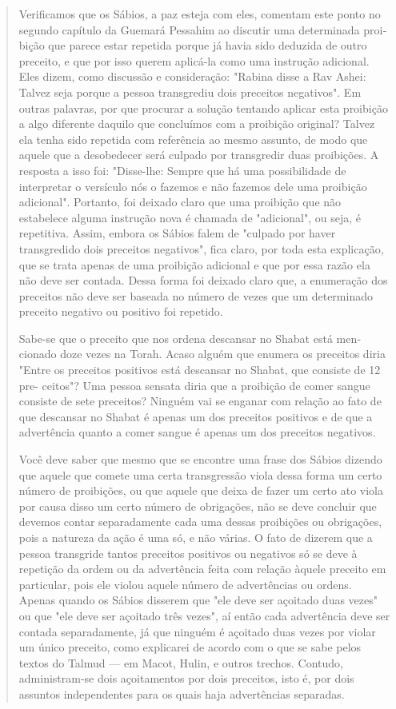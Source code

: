 \begin{quote}
Verificamos que os Sábios, a paz esteja com eles, comentam este pon­to
no segundo capítulo da Guemará Pessahim ao discutir uma determinada
proi­bição que parece estar repetida porque já havia sido deduzida de
outro precei­to, e que por isso querem aplicá-la como uma instrução
adicional. Eles dizem, como discussão e consideração: "Rabina disse a
Rav Ashei: Talvez seja porque a pessoa transgrediu dois preceitos
negativos". Em outras palavras, por que pro­curar a solução tentando
aplicar esta proibição a algo diferente daquilo que con­cluímos com a
proibição original? Talvez ela tenha sido repetida com referên­cia ao
mesmo assunto, de modo que aquele que a desobedecer será culpado por
transgredir duas proibições. A resposta a isso foi: "Disse-lhe: Sempre
que há uma possibilidade de interpretar o versículo nós o fazemos e não
fazemos dele uma proibição adicional". Portanto, foi deixado claro que
uma proibição que não estabelece alguma instrução nova é chamada de
"adicional", ou seja, é repetitiva. Assim, embora os Sábios falem de
"culpado por haver transgredi­do dois preceitos negativos", fica claro,
por toda esta explicação, que se trata apenas de uma proibição adicional
e que por essa razão ela não deve ser conta­da. Dessa forma foi deixado
claro que, a enumeração dos preceitos não deve ser baseada no número de
vezes que um determinado preceito negativo ou po­sitivo foi repetido.

Sabe-se que o preceito que nos ordena descansar no Shabat está
men­cionado doze vezes na Torah. Acaso alguém que enumera os preceitos
diria "Entre os preceitos positivos está descansar no Shabat, que
consiste de 12 pre-
ceitos"? Uma pessoa sensata diria que a proibição de comer sangue
consiste de sete preceitos? Ninguém vai se enganar com relação ao fato
de que descan­sar no Shabat é apenas um dos preceitos positivos e de que
a advertência quan­to a comer sangue é apenas um dos preceitos
negativos.

Você deve saber que mesmo que se encontre uma frase dos Sábios dizendo
que aquele que comete uma certa transgressão viola dessa forma um certo
número de proibições, ou que aquele que deixa de fazer um certo ato
viola por causa disso um certo número de obrigações, não se deve
concluir que devemos contar separadamente cada uma dessas proibições ou
obrigações, pois a natureza da ação é uma só, e não várias. O fato de
dizerem que a pessoa transgride tantos preceitos positivos ou negativos
só se deve à repetição da or­dem ou da advertência feita com relação
àquele preceito em particular, pois ele violou aquele número de
advertências ou ordens. Apenas quando os Sábios disserem que "ele deve
ser açoitado duas vezes" ou que "ele deve ser açoitado três vezes", aí
então cada advertência deve ser contada separadamente, já que ninguém é
açoitado duas vezes por violar um único preceito, como explicarei de
acordo com o que se sabe pelos textos do Talmud --- em Macot, Hulin, e
outros trechos. Contudo, administram-se dois açoitamentos por dois
preceitos, isto é, por dois assuntos independentes para os quais haja
advertências separadas.


\end{quote}

